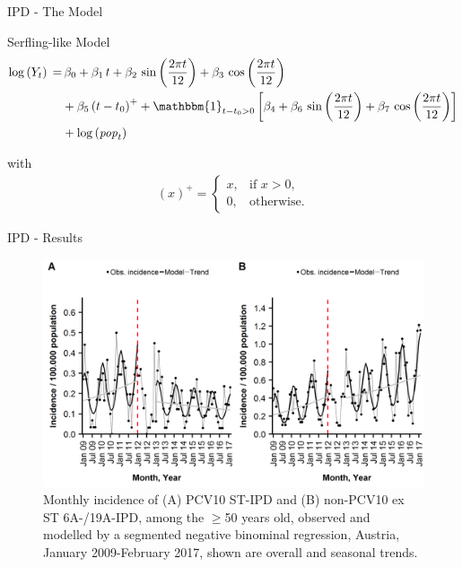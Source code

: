\documentclass[table]{beamer}\usepackage[]{graphicx}\usepackage[]{color}
\newcommand{\Sin}[1]{\sin\left(#1\right)}%
\newcommand{\Cos}[1]{\cos\left(#1\right)}%
\newcommand{\Log}[1]{\log\left(#1\right)}%
\newcommand{\mli}[1]{\mathit{#1}}%
\begin{document}
\begin{frame}[fragile]{IPD - The Model}
\begin{block}{Serfling-like Model}
\begin{align*}
\begin{split}
\Log{Y_t}\, =
  &\, \beta_0+\beta_1\,t + \beta_2\,\Sin{\frac{2 \pi t}{12}} + \beta_3\,\Cos{\frac{2 \pi t}{12}} \\
  &+ \beta_5\left(t-t_0\right)^+ + \mathbbm{1}_{t-t_0>0} \left[\beta_4 + \beta_6\,\sin\left(\frac{2 \pi t}{12}\right) + \beta_7\,\cos\left(\frac{2 \pi t}{12}\right)\right] \\
  &+ \Log{\mli{pop}_t}
\end{split}
\end{align*}

with
\begin{align*} 
(x)^+ = 
\begin{cases}
x, &\text{if $x > 0$,}\\
0, &\text{otherwise.}
\end{cases}
\end{align*}
\end{block}
\vfill
{\scriptsize \cite{richter2019}}
\end{frame}

\begin{frame}[fragile]{IPD - Results}
\begin{center}
\begin{figure}
  \centering
  \caption{Monthly incidence of (A) PCV10 ST-IPD and (B) non-PCV10 ex ST 6A-/19A-IPD, among the $\ge$50 years old, observed and modelled by a segmented negative binominal regression, Austria, January 2009-February 2017, shown are overall and seasonal trends.}
  \includegraphics[width=\textwidth,height=0.5\textheight,keepaspectratio]{richter2019_Fig3.png}
\end{figure}
\end{center}
\end{frame}
\end{document}
